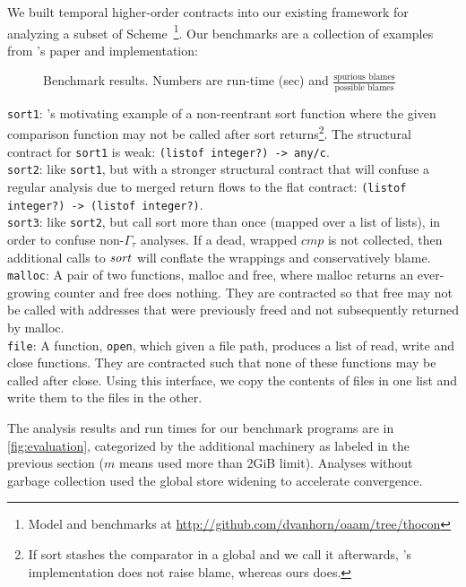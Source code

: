 We built temporal higher-order contracts into our existing framework for analyzing a subset of Scheme~\citep{ianjohnson:oaam:icfp2013}\footnote{Model and benchmarks at \url{http://github.com/dvanhorn/oaam/tree/thocon}}.
%
Our benchmarks are a collection of examples from \dfm's paper and implementation:
\\
\FloatBarrier
\begin{figure}
  
  \caption{Benchmark results. Numbers are run-time (sec) and $\frac{\text{spurious blames}}{\text{possible blames}}$}
  \label{fig:evaluation}
\end{figure}
\noindent
{\tt sort1}:{ \dfm's motivating example of a non-reentrant sort function where the given comparison function may not be called after sort returns\footnote{If sort stashes the comparator in a global and we call it afterwards, \dfm's implementation does not raise blame, whereas ours does.}.
%
The structural contract for {\tt sort1} is weak: {\tt (listof integer?) -> any/c}.
}
\\
{\tt sort2}: like {\tt sort1}, but with a stronger structural contract that will confuse a regular analysis due to merged return flows to the flat contract: {\tt (listof integer?) -> (listof integer?)}.
\\
{\tt sort3}: like {\tt sort2}, but call sort more than once (mapped over a list of lists), in order to confuse non-$\Gamma_\tau$ analyses. If a dead, wrapped $\mathit{cmp}$ is not collected, then additional calls to $\mathit{sort}$ will conflate the wrappings and conservatively blame.
\\
{\tt malloc}: A pair of two functions, malloc and free, where malloc returns an ever-growing counter and free does nothing. They are contracted so that free may not be called with addresses that were previously freed and not subsequently returned by malloc.
\\
{\tt file}: A function, {\tt open}, which given a file path, produces a list of read, write and close functions. They are contracted such that none of these functions may be called after close. Using this interface, we copy the contents of files in one list and write them to the files in the other.

The analysis results and run times for our benchmark programs are in \autoref{fig:evaluation}, categorized by the additional machinery as labeled in the previous section ($m$ means used more than 2GiB limit).
%
Analyses without garbage collection used the global store widening to accelerate convergence.

